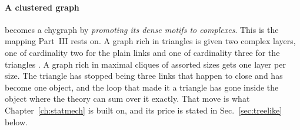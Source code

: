 \paragraph{A clustered graph} becomes a chygraph by \emph{promoting its dense
motifs to complexes}. This is the mapping Part~III rests on. A graph rich in triangles is given two complex layers, one of
cardinality two for the plain links and one of cardinality three for the
triangles \citep{newman2009,karrer2010}. A graph rich in maximal cliques of
assorted sizes gets one layer per size. The triangle has stopped being three
links that happen to close and has become one object, and the loop that made it
a triangle has gone inside the object where the theory can sum over it exactly.
That move is what Chapter~\ref{ch:statmech} is built on, and its price is stated
in Sec.~\ref{sec:treelike} below.

